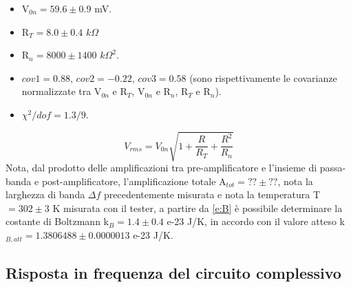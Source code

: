 \begin{itemize}
\item V$_{0n} = 59.6 \pm 0.9$ mV.
\item R$_T = 8.0 \pm 0.4$ $k\Omega$
\item R$_n = 8000 \pm 1400$ ${k\Omega}^2$.
\item $cov1 = 0.88$, $cov2 = -0.22$, $cov3 = 0.58$ (sono rispettivamente le covarianze normalizzate tra V$_{0n}$ e R$_T$, V$_{0n}$ e R$_n$, R$_T$ e R$_n$).
\item $\chi^2/dof = 1.3/9$.
\end{itemize}
\begin{equation}
V_{rms} = V_{0n} \sqrt{1+\frac{R}{R_T} + \frac{R^2}{R_n}}
\label{e:tot}
\end{equation}
Nota, dal prodotto delle amplificazioni tra pre-amplificatore e l'insieme di passa-banda e post-amplificatore, l'amplificazione totale A$_{tot} = ?? \pm ??$, nota la larghezza di banda $\Delta f$ precedentemente misurata e nota la temperatura T$ = 302 \pm 3$ K misurata con il tester, a partire da \ref{e:B} è possibile determinare la costante di Boltzmann k$_B = 1.4 \pm 0.4$ e-23 J/K, in accordo con il valore atteso k$_{B,att} = 1.3806488 \pm 0.0000013$ e-23 J/K.
\subsection{Risposta in frequenza del circuito complessivo}

